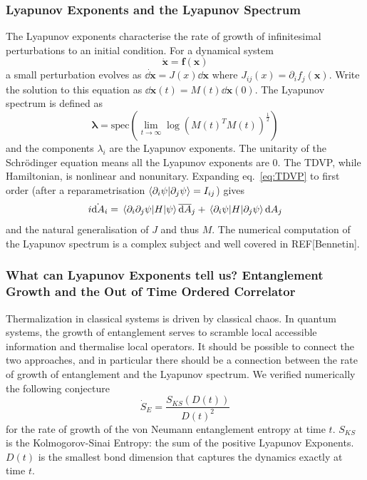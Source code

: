 \documentclass{article}
\let\vec\bm
\begin{document}
\subsubsection{Lyapunov Exponents and the Lyapunov Spectrum}
%
The Lyapunov exponents characterise the rate of growth of infinitesimal perturbations to an initial condition.
For a dynamical system
\begin{equation}
    \dot{\vec{x}} = \vec{f}(\vec{x})
\end{equation}
a small perturbation evolves as $\dot{\dd{\vec{x}}} = J(x) \dd{\vec{x}} $
where $J_{ij}(x) = \partial_i f_j(\vec{x})$.
Write the solution to this equation as $\dd{\vec{x}}(t)= M(t) \dd{\vec{x}}(0)$.
The Lyapunov spectrum is defined as
\begin{equation}
    \vec{\lambda} = \mathrm{spec}\left(\lim_{t\rightarrow\infty}\log(M(t)^T M(t))^{\frac{1}{2}}\right)
\end{equation}
and the components $\lambda_i$ are the Lyapunov exponents.
The unitarity of the Schr\"odinger equation means all the Lyapunov exponents are 0.
The TDVP, while Hamiltonian, is nonlinear and nonunitary. 
Expanding eq.~\ref{eq:TDVP} to first order (after a reparametrisation $\braket{\partial_i\psi}{\partial_j\psi}={I}_{ij}$) gives
\begin{equation}
    i \dot{\dd{A}}_i = \mel{\partial_i\partial_j\psi}{H}{\psi} \overline{\dd{A}}_j+\mel{\partial_i\psi}{H}{\partial_j\psi}\dd{A}_j\label{eq:linTDVP}
\end{equation}
and the natural generalisation of $J$ and thus $M$.
The numerical computation of the Lyapunov spectrum is a complex subject and well covered in REF[Bennetin].
%
\subsubsection{What can Lyapunov Exponents tell us? Entanglement Growth and the Out of Time Ordered Correlator}
%
Thermalization in classical systems is driven by classical chaos. 
In quantum systems, the growth of entanglement serves to scramble local accessible information and thermalise local operators. 
It should be possible to connect the two approaches, and in particular there should be a connection between the rate of growth of entanglement and the Lyapunov spectrum. 
We verified numerically the following conjecture
\begin{equation}
    \dot{S}_E = \frac{S_{KS}(D(t))}{D(t)^2}
\end{equation}
for the rate of growth of the von Neumann entanglement entropy at time $t$.
$S_{KS}$ is the Kolmogorov-Sinai Entropy: the sum of the positive Lyapunov Exponents. 
$D(t)$ is the smallest bond dimension that captures the dynamics exactly at time $t$.
%
\end{document}
